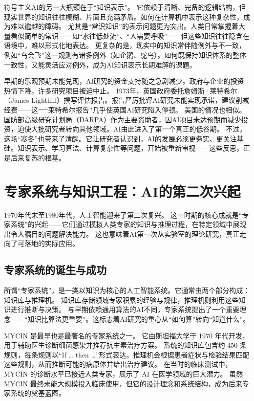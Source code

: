 符号主义AI的另一大瓶颈在于“知识表示”。  
它依赖于清晰、完备的逻辑结构，但现实世界的知识往往模糊、片面且充满矛盾。如何在计算机中表示这种复杂性，成为难以逾越的障碍。  
尤其是“常识知识”的表示问题更为突出。人类日常掌握着大量看似简单的常识——如“水往低处流”、“人需要呼吸”——但这些知识往往隐含在语境中，难以形式化地表达。  
更复杂的是，现实中的知识常伴随例外与不一致，例如“鸟会飞”这一规则有诸多例外（如企鹅、鸵鸟）。如何既保持知识体系的整体一致性，又能灵活应对例外，成为AI知识表示长期难解的课题。

早期的乐观预期未能兑现，AI研究的资金支持随之急剧减少。政府与企业的投资热情下降，许多研究项目被迫中止。  
1973年，英国政府委托詹姆斯·莱特希尔（James Lighthill）撰写评估报告。报告严厉批评AI研究未能实现承诺，建议削减经费——这一“莱特希尔报告”几乎使英国AI研究陷入停顿。  
美国的情况也相似。国防部高级研究计划局（DARPA）作为主要资助者，因AI项目未达预期而减少投资，迫使大批研究者转向其他领域。AI由此进入了第一个真正的低谷期。  
不过，这场“寒冬”也带来了清醒。它让研究者认识到，AI的发展必须更务实、更关注基础。知识表示、学习算法、计算复杂性等问题，开始被重新审视——这些反思，正是后来复苏的根基。

\section{专家系统与知识工程：AI的第二次兴起}

1970年代末至1980年代，人工智能迎来了第二次复兴。  
这一时期的核心成就是“专家系统”的兴起——它们通过模拟人类专家的知识与推理过程，在特定领域中展现出令人瞩目的问题解决能力。  
这也意味着AI第一次从实验室的理论研究，真正走向了可落地的实际应用。

\subsection{专家系统的诞生与成功}

所谓“专家系统”，是一类以知识为核心的人工智能系统。它通常由两个部分构成：知识库与推理机。  
知识库存储领域专家积累的经验与规律，推理机则利用这些知识进行推断与决策。  
与早期依赖通用算法的AI不同，专家系统提出了一个重要理念——“知识比算法更重要”。这标志着AI研究的重心从“如何算”转向“知道什么”。

MYCIN 是最早也是最著名的专家系统之一。  
它由斯坦福大学于 1970 年代开发，用于辅助医生诊断细菌感染并推荐抗生素治疗方案。  
系统的知识库包含约 450 条规则，每条规则以“If … then …”形式表达。推理机会根据患者症状与检验结果匹配这些规则，从而推断可能的病原体并给出治疗建议。  
在当时的临床测试中，MYCIN 的诊断水平已接近人类专家，展示了 AI 在医学领域的巨大潜力。  
虽然 MYCIN 最终未能大规模投入临床使用，但它的设计理念和系统结构，成为后来专家系统的奠基蓝图。

